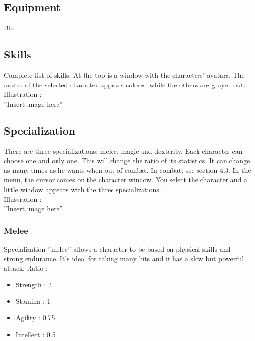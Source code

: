 \documentclass[a4paper,12pt]{book}
\begin{document}
\subsection{Equipment}
Bla
\subsection{Skills}
Complete list of skills. At the top is a window with the characters' avatars. The avatar of the selected character appears colored while the others are grayed out. \\ Illustration : \\ ''Insert image here''
\subsection{Specialization}
There are three specializations: melee, magic and dexterity. Each character can choose one and only one. This will change the ratio of its statistics. It can change as many times as he wants when out of combat. In combat: see section 4.3.
In the menu, the cursor comes on the character window. You select the character and a little window appears with the three specializations. \\ Illustration : \\ ''Insert image here''
\subsubsection{Melee}
Specialization ''melee'' allows a character to be based on physical skills and strong endurance. It's ideal for taking many hits and it has a slow but powerful attack. \newpage
Ratio :
\begin{itemize}
	\item Strength : 2
	\item Stamina : 1
	\item Agility : 0.75
	\item Intellect : 0.5
\end{itemize}
\end{document}

